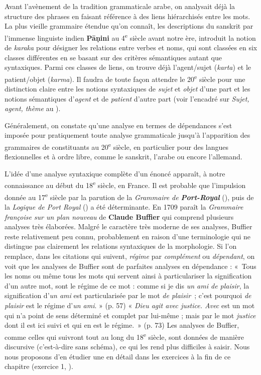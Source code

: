 {    Avant l’avènement de la tradition grammaticale arabe, on analysait déjà la structure des phrases en faisant référence à des liens hiérarchisés entre les mots. La plus vieille grammaire étendue qu’on connaît, les descriptions du sanskrit par l’immense linguiste indien \textbf{Pāṇini} au 4\textsuperscript{e} siècle avant notre ère, introduit la notion de \textit{karaka} pour désigner les relations entre verbes et noms, qui sont classées en six classes différentes en se basant sur des critères sémantiques autant que syntaxiques. Parmi ces classes de liens, on trouve déjà l’agent/sujet (\textit{karta}) et le patient/objet (\textit{karma}). Il faudra de toute façon attendre le 20\textsuperscript{e} siècle pour une distinction claire entre les notions syntaxiques de \textit{sujet} et \textit{objet} d’une part et les notions sémantiques d’\textit{agent} et de \textit{patient} d’autre part (voir l’encadré sur \textit{Sujet, agent, thème} au ).

    Généralement, on constate qu’une analyse en termes de dépendances s’est imposée pour pratiquement toute analyse grammaticale jusqu’à l’apparition des grammaires de constituants au 20\textsuperscript{e} siècle, en particulier pour des langues flexionnelles et à ordre libre, comme le sanskrit, l’arabe ou encore l’allemand.

    L’idée d’une analyse syntaxique complète d’un énoncé apparaît, à notre connaissance au début du 18\textsuperscript{e} siècle, en France. Il est probable que l’impulsion donnée au 17\textsuperscript{e} siècle par la parution de la \textit{Grammaire de} \textbf{\textit{Port-Royal}} (\citealt{ArnauldLancelot1660}), puis de la \textit{Logique de Port Royal} (\citealt{ArnauldNicole1662}) a été déterminante. En 1709 paraît la \textit{Grammaire françoise sur un plan nouveau} de \textbf{Claude Buffier} qui comprend plusieurs analyses très élaborées. Malgré le caractère très moderne de ses analyses, Buffier reste relativement peu connu, probablement en raison d’une terminologie qui ne distingue pas clairement les relations syntaxiques de la morphologie. Si l’on remplace, dans les citations qui suivent, \textit{régime} par \textit{complément} ou \textit{dépendant}, on voit que les analyses de Buffier sont de parfaites analyses en dépendance : «~Tous les noms ou même tous les mots qui servent ainsi à particulariser la signification d’un autre mot, sont le régime de ce mot : comme si je dis \textit{un ami de plaisir}, la signification d’\textit{un ami} est particularisée par le mot \textit{de plaisir~}; c’est pourquoi \textit{de plaisir} est le régime d’\textit{un ami}. » (p. 57) « \textit{Dieu agit avec justice. Avec} est un mot qui n’a point de sens déterminé et complet par lui-même ; mais par le mot \textit{justice} dont il est ici suivi et qui en est le régime.~» (p. 73) Les analyses de Buffier, comme celles qui suivront tout au long du 18\textsuperscript{e} siècle, sont données de manière discursive (c’est-à-dire sans schéma), ce qui les rend plus difficiles à saisir. Nous nous proposons d’en étudier une en détail dans les exercices à la fin de ce chapitre (exercice 1, ).

}
